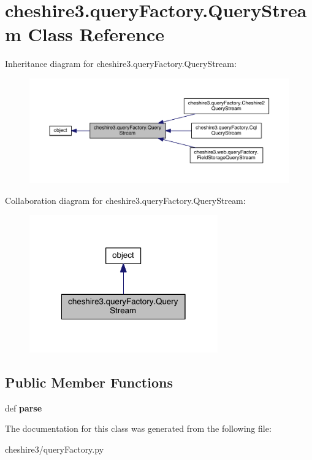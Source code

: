 \hypertarget{classcheshire3_1_1query_factory_1_1_query_stream}{\section{cheshire3.\-query\-Factory.\-Query\-Stream Class Reference}
\label{classcheshire3_1_1query_factory_1_1_query_stream}
}


Inheritance diagram for cheshire3.\-query\-Factory.\-Query\-Stream\-:
\nopagebreak
\begin{figure}[H]
\begin{center}
\leavevmode
\includegraphics[width=350pt]{classcheshire3_1_1query_factory_1_1_query_stream__inherit__graph}
\end{center}
\end{figure}


Collaboration diagram for cheshire3.\-query\-Factory.\-Query\-Stream\-:
\nopagebreak
\begin{figure}[H]
\begin{center}
\leavevmode
\includegraphics[width=230pt]{classcheshire3_1_1query_factory_1_1_query_stream__coll__graph}
\end{center}
\end{figure}
\subsection*{Public Member Functions}
\begin{DoxyCompactItemize}
\item 
\hypertarget{classcheshire3_1_1query_factory_1_1_query_stream_a55087c9cbec346499ba18980d2f6eeb7}{def {\bfseries parse}}\label{classcheshire3_1_1query_factory_1_1_query_stream_a55087c9cbec346499ba18980d2f6eeb7}

\end{DoxyCompactItemize}


The documentation for this class was generated from the following file\-:\begin{DoxyCompactItemize}
\item 
cheshire3/query\-Factory.\-py\end{DoxyCompactItemize}

